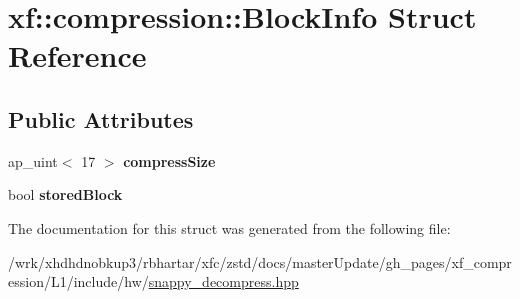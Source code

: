 \hypertarget{structxf_1_1compression_1_1BlockInfo}{\section{xf\-:\-:compression\-:\-:Block\-Info Struct Reference}
\label{structxf_1_1compression_1_1BlockInfo}
}
\subsection*{Public Attributes}
\begin{DoxyCompactItemize}
\item 
\hypertarget{structxf_1_1compression_1_1BlockInfo_a5a047270fafd37883e9864301ba875ce}{ap\-\_\-uint$<$ 17 $>$ {\bfseries compress\-Size}}\label{structxf_1_1compression_1_1BlockInfo_a5a047270fafd37883e9864301ba875ce}

\item 
\hypertarget{structxf_1_1compression_1_1BlockInfo_a7441cde438d96163a8dc49e8b0682c92}{bool {\bfseries stored\-Block}}\label{structxf_1_1compression_1_1BlockInfo_a7441cde438d96163a8dc49e8b0682c92}

\end{DoxyCompactItemize}


The documentation for this struct was generated from the following file\-:\begin{DoxyCompactItemize}
\item 
/wrk/xhdhdnobkup3/rbhartar/xfc/zstd/docs/master\-Update/gh\-\_\-pages/xf\-\_\-compression/\-L1/include/hw/\hyperlink{snappy__decompress_8hpp}{snappy\-\_\-decompress.\-hpp}\end{DoxyCompactItemize}
